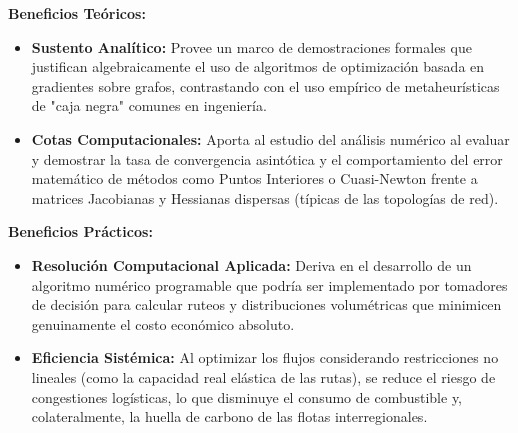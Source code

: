 \textbf{Beneficios Teóricos:}
\begin{itemize}
    \item \textbf{Sustento Analítico:} Provee un marco de demostraciones formales que justifican algebraicamente el uso de algoritmos de optimización basada en gradientes sobre grafos, contrastando con el uso empírico de metaheurísticas de "caja negra" comunes en ingeniería.
    \item \textbf{Cotas Computacionales:} Aporta al estudio del análisis numérico al evaluar y demostrar la tasa de convergencia asintótica y el comportamiento del error matemático de métodos como Puntos Interiores o Cuasi-Newton frente a matrices Jacobianas y Hessianas dispersas (típicas de las topologías de red).
\end{itemize}

\textbf{Beneficios Prácticos:}
\begin{itemize}
    \item \textbf{Resolución Computacional Aplicada:} Deriva en el desarrollo de un algoritmo numérico programable que podría ser implementado por tomadores de decisión para calcular ruteos y distribuciones volumétricas que minimicen genuinamente el costo económico absoluto.
    \item \textbf{Eficiencia Sistémica:} Al optimizar los flujos considerando restricciones no lineales (como la capacidad real elástica de las rutas), se reduce el riesgo de congestiones logísticas, lo que disminuye el consumo de combustible y, colateralmente, la huella de carbono de las flotas interregionales.
\end{itemize}
